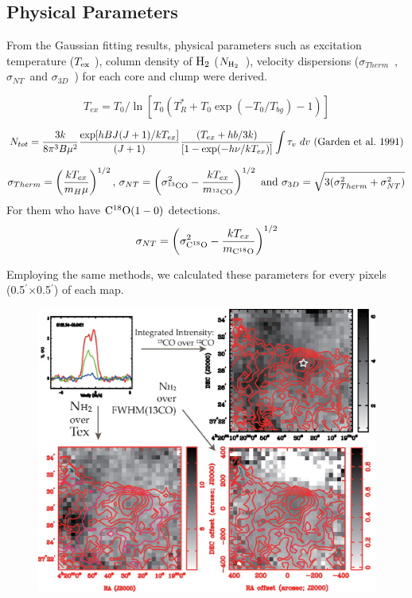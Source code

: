 \documentclass{article}
\newcommand{\cob}{$\rm ^{13}CO$ }
\newcommand{\coaa}{$\rm^{12}CO(1-0)$ }
\newcommand{\cobb}{$\rm^{13}CO(1-0)$ }
\newcommand{\cocc}{$\rm C^{18}O(1-0)$ }
\newcommand{\multi}{$\times$}
\newcommand{\texc}{$T_{\rm {ex}}$ }
\newcommand{\nhyd}{$N_{\rm H_2}$\ }
\newcommand{\sigmath}{$\sigma _{Therm}$\ }
\newcommand{\sigmant}{$\sigma _{NT}$\ }
\newcommand{\sigmatd}{$\sigma _{3D}$\ }
\newcommand{\arcmin}{$^{\prime}$}
\begin{document}
 \subsection{Physical Parameters}
            From the Gaussian fitting results, physical parameters such as excitation temperature (\texc), column density of $\rm H_2$ (\nhyd), velocity dispersions (\sigmath, \sigmant and \sigmatd) for each core and clump were derived.
            \begin{footnotesize}
                $$
                T_{ex} = T_0 / \ln[T_0 (T^*_R + T_0 \exp{(-T_0/T_{bg})}-1)]
                $$

                $$
                N_{tot}=\frac{3k}{8\pi ^3B\mu ^2}\frac{\exp[hBJ(J+1)/kT_{ex}]}{(J+1)}\frac{(T_{ex}+hb/3k)}{[1-\exp(-h\nu/kT_{ex})]}\int \tau_{v}\ dv\ \rm (Garden\ et\ al.\ 1991)
                $$

              $$
              \sigma_{Therm}=\left( \frac{kT_{ex}}{m_H \mu} \right)^{1/2}{\rm ,}\  \sigma_{NT}=\left(\sigma ^2 _{^{13}{\rm CO}}- \frac{kT_{ex}}{m_{^{13}{\rm CO}}} \right)^{1/2}\ {\rm and}\  \sigma_{3D}=\sqrt{3(\sigma _{Therm}^2+\sigma _{NT}^2)}
              $$
              For them who have \cocc detections.
              $$
              \sigma_{NT}=\left(\sigma ^2 _{{\rm C^{18}O}}- \frac{kT_{ex}}{m_{{\rm C^{18}O}}} \right)^{1/2}
              $$
            \end{footnotesize}

            Employing the same methods, we calculated these parameters for every pixels (0.5\arcmin \multi 0.5\arcmin) of each map.

\newpage
        \begin{figure}[H]
          \centering
          \includegraphics[totalheight=90mm]{Phy_para.eps}
       \end{figure}
\end{document}
